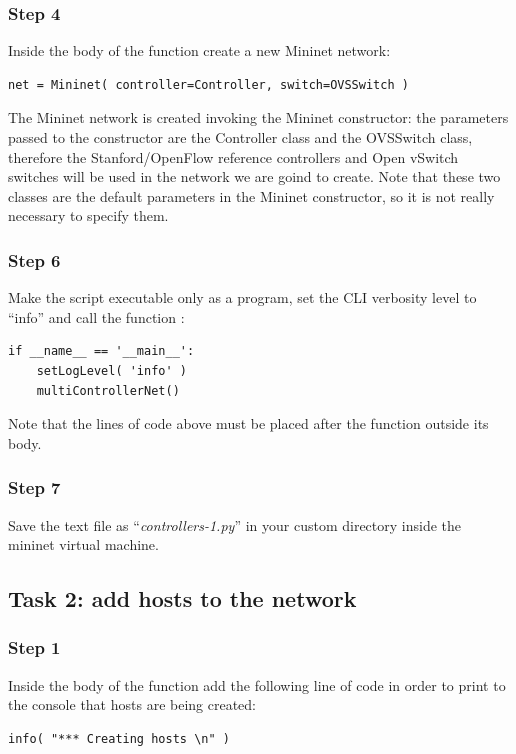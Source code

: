 \subsubsection*{Step 4}
Inside the body of the function  create a new Mininet
network:
\begin{lstlisting}
net = Mininet( controller=Controller, switch=OVSSwitch )
\end{lstlisting}

The Mininet network is created invoking the Mininet constructor: the parameters
passed to the constructor are the Controller class and the OVSSwitch class, therefore
the Stanford/OpenFlow reference controllers and Open vSwitch switches will be used
in the network we are goind to create. Note that these two classes are
the default parameters in the Mininet constructor, so it is not really necessary
to specify them.

\subsubsection*{Step 6}
Make the script executable only as a program, set the CLI verbosity level to ``info''
and call the function :
\begin{lstlisting}
if __name__ == '__main__':
    setLogLevel( 'info' )
    multiControllerNet()
\end{lstlisting}
Note that the lines of code above must be placed after the function 
outside its body.

\subsubsection*{Step 7}
Save the text file as ``\emph{controllers-1.py}'' in your custom directory inside
the mininet virtual machine.





\subsection*{Task 2: add hosts to the network}
\subsubsection*{Step 1}
Inside the body of the function  add the following line
of code in order to print to the console that hosts are being created:
\begin{lstlisting}
info( "*** Creating hosts \n" )
\end{lstlisting}

